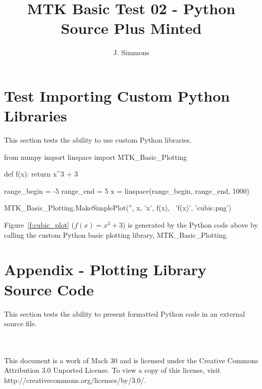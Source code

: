 \documentclass{article}
\title{MTK Basic Test 02 - Python Source Plus Minted}
\author{J. Simmons}
\begin{document}
\maketitle

\section{Test Importing Custom Python Libraries}
This section tests the ability to use custom Python libraries.

\begin{sageblock}
  from numpy import linspace
  import MTK_Basic_Plotting
  
  def f(x):
    return x^3 + 3
  
  range_begin = -5
  range_end = 5 
  x = linspace(range_begin, range_end, 1000)
  
    
  MTK_Basic_Plotting.MakeSimplePlot('', x, 'x', f(x), \ 
                                    'f(x)', 'cubic.png')  
  
\end{sageblock}

Figure~\ref{f:cubic_plot} ($f(x) = x^3 + 3$) is generated by the Python code above by calling the custom Python basic plotting library, MTK\_Basic\_Plotting.

\clearpage


\section*{Appendix - Plotting Library Source Code}
This section tests the ability to present formatted Python code in an external source file.

\inputminted[linenos,frame=lines,framesep=2.0\fboxsep]{python}{MTK_Basic_Plotting.py}

\section*{}
This document is a work of Mach 30 and is licensed under the Creative Commons Attribution 3.0 Unported License. To view a copy of this license, visit http://creativecommons.org/licenses/by/3.0/.
\end{document}
